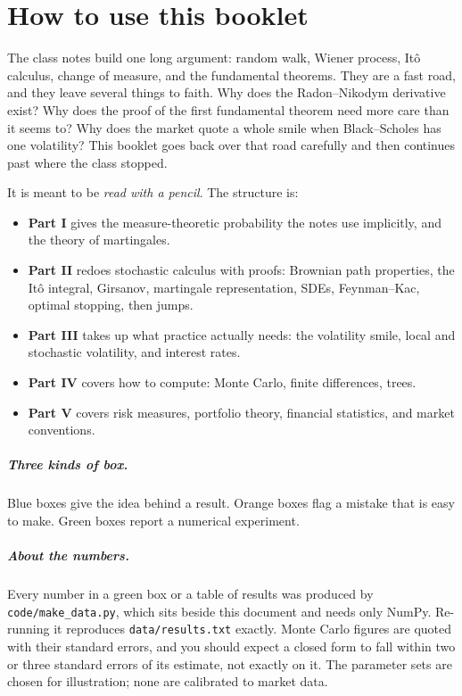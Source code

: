 \chapter{How to use this booklet}

The class notes build one long argument: random walk, Wiener process, It\^o calculus, change of measure, and the fundamental theorems. They are a fast road, and they leave several things to faith. Why does the Radon--Nikodym derivative exist? Why does the proof of the first fundamental theorem need more care than it seems to? Why does the market quote a whole smile when Black--Scholes has one volatility? This booklet goes back over that road carefully and then continues past where the class stopped.

It is meant to be \emph{read with a pencil}. The structure is:
\begin{itemize}
\item \textbf{Part I} gives the measure-theoretic probability the notes use implicitly, and the theory of martingales.
\item \textbf{Part II} redoes stochastic calculus with proofs: Brownian path properties, the It\^o integral, Girsanov, martingale representation, SDEs, Feynman--Kac, optimal stopping, then jumps.
\item \textbf{Part III} takes up what practice actually needs: the volatility smile, local and stochastic volatility, and interest rates.
\item \textbf{Part IV} covers how to compute: Monte Carlo, finite differences, trees.
\item \textbf{Part V} covers risk measures, portfolio theory, financial statistics, and market conventions.
\end{itemize}

\paragraph{Three kinds of box.} Blue boxes give the idea behind a result. Orange boxes flag a mistake that is easy to make. Green boxes report a numerical experiment.

\paragraph{About the numbers.} Every number in a green box or a table of results was produced by \texttt{code/make\_data.py}, which sits beside this document and needs only NumPy. Re-running it reproduces \texttt{data/results.txt} exactly. Monte Carlo figures are quoted with their standard errors, and you should expect a closed form to fall within two or three standard errors of its estimate, not exactly on it. The parameter sets are chosen for illustration; none are calibrated to market data.

